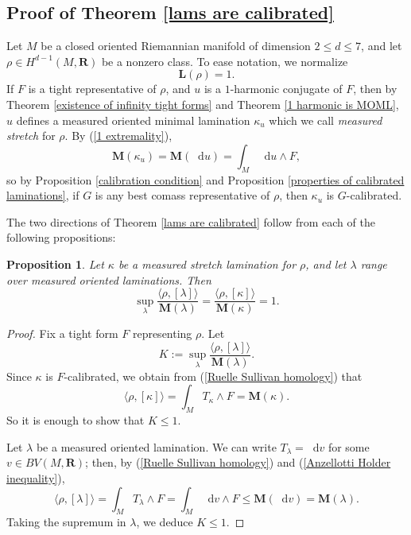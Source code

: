 \documentclass[reqno,11pt]{amsart}
\newcommand{\RR}{\mathbf{R}}
\newcommand*\dif{\mathop{}\!\mathrm{d}}
\newcommand{\Mass}{\mathbf M}
\newcommand{\Comass}{\mathbf L}
\newcommand{\dfn}[1]{\emph{#1}\index{#1}}
\newtheorem{proposition}[theorem]{Proposition}
\theoremstyle{definition}
\numberwithin{equation}{section}
\begin{document}
\subsection{Proof of Theorem \ref{lams are calibrated}}\label{proof of Theorem B}
Let $M$ be a closed oriented Riemannian manifold of dimension $2 \leq d \leq 7$, and let $\rho \in H^{d - 1}(M, \RR)$ be a nonzero class.
To ease notation, we normalize
$$\Comass(\rho) = 1.$$
If $F$ is a tight representative of $\rho$, and $u$ is a $1$-harmonic conjugate of $F$, then by Theorem \ref{existence of infinity tight forms} and Theorem \ref{1 harmonic is MOML}, $u$ defines a measured oriented minimal lamination $\kappa_u$ which we call \dfn{measured stretch} for $\rho$.
By (\ref{1 extremality}),
$$\Mass(\kappa_u) = \Mass(\dif u) = \int_M \dif u \wedge F,$$
so by Proposition \ref{calibration condition} and Proposition \ref{properties of calibrated laminations}, if $G$ is any best comass representative of $\rho$, then $\kappa_u$ is $G$-calibrated.

The two directions of Theorem \ref{lams are calibrated} follow from each of the following propositions:

\begin{proposition}\label{L equals K}
Let $\kappa$ be a measured stretch lamination for $\rho$, and let $\lambda$ range over measured oriented laminations. Then 
	\begin{equation}\label{L equals K formula}
	\sup_\lambda \frac{\langle \rho, [\lambda]\rangle}{\Mass(\lambda)} = \frac{\langle \rho, [\kappa]\rangle}{\Mass(\kappa)} = 1.
	\end{equation}
\end{proposition}
\begin{proof}
Fix a tight form $F$ representing $\rho$.
Let
$$K :=  \sup_\lambda \frac{\langle \rho, [\lambda]\rangle}{\Mass(\lambda)}.$$
Since $\kappa$ is $F$-calibrated, we obtain from (\ref{Ruelle Sullivan homology}) that
$$\langle \rho, [\kappa]\rangle = \int_M T_\kappa \wedge F = \Mass(\kappa).$$
So it is enough to show that $K \leq 1$.

Let $\lambda$ be a measured oriented lamination.
We can write $T_\lambda = \dif v$ for some $v \in BV(M, \RR)$; then, by (\ref{Ruelle Sullivan homology}) and (\ref{Anzellotti Holder inequality}),
$$\langle \rho, [\lambda]\rangle = \int_M T_\lambda \wedge F = \int_M \dif v \wedge F \leq \Mass(\dif v) = \Mass(\lambda).$$
Taking the supremum in $\lambda$, we deduce $K \leq 1$.
\end{proof}
\end{document}
